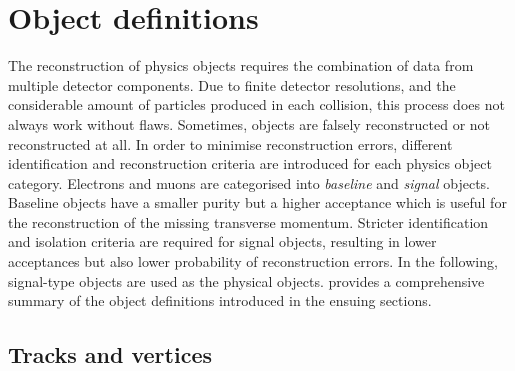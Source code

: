 \section{Object definitions}\label{sec:object_definitions}

The reconstruction of physics objects requires the combination of data from multiple detector components. Due to finite detector resolutions, and the considerable amount of particles produced in each collision, this process does not always work without flaws. Sometimes, objects are falsely reconstructed or not reconstructed at all. In order to minimise reconstruction errors, different identification and reconstruction criteria are introduced for each physics object category. Electrons and muons are categorised into \textit{baseline} and \textit{signal} objects. Baseline objects have a smaller purity but a higher acceptance which is \eg useful for the reconstruction of the missing transverse momentum. Stricter identification and isolation criteria are required for signal objects, resulting in lower acceptances but also lower probability of reconstruction errors. In the following, signal-type objects are used as the physical objects.  provides a comprehensive summary of the object definitions introduced in the ensuing sections.

\subsection{Tracks and vertices}\label{sec:reco_tracks}

